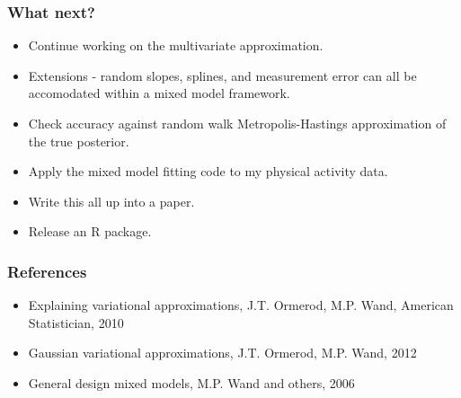 \documentclass{beamer}
\begin{document}
\begin{frame}
\frametitle{What next?}
\begin{itemize}
\item Continue working on the multivariate approximation.
\item Extensions - random slopes, splines, and measurement error can all be 
accomodated within a mixed model framework.
\item Check accuracy against random walk Metropolis-Hastings approximation
of the true posterior.
\item Apply the mixed model fitting code to my physical activity data.
\item Write this all up into a paper.
\item Release an R package.
\end{itemize}
\end{frame}

\begin{frame}
\frametitle{References}
\begin{itemize}
\item Explaining variational approximations, J.T. Ormerod, M.P. Wand, American Statistician, 2010
\item Gaussian variational approximations, J.T. Ormerod, M.P. Wand, 2012
\item General design mixed models, M.P. Wand and others, 2006
\end{itemize}
\end{frame}

\end{document}
